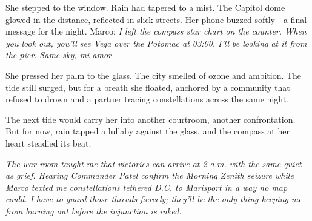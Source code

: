 She stepped to the window. Rain had tapered to a mist. The Capitol dome glowed in the distance, reflected in slick streets. Her phone buzzed softly—a final message for the night. Marco: \textit{I left the compass star chart on the counter. When you look out, you'll see Vega over the Potomac at 03:00. I'll be looking at it from the pier. Same sky, mi amor.}

She pressed her palm to the glass. The city smelled of ozone and ambition. The tide still surged, but for a breath she floated, anchored by a community that refused to drown and a partner tracing constellations across the same night.

The next tide would carry her into another courtroom, another confrontation. But for now, rain tapped a lullaby against the glass, and the compass at her heart steadied its beat.

\noindent\textit{The war room taught me that victories can arrive at 2 a.m. with the same quiet as grief. Hearing Commander Patel confirm the \textit{Morning Zenith} seizure while Marco texted me constellations tethered D.C. to Marisport in a way no map could. I have to guard those threads fiercely; they'll be the only thing keeping me from burning out before the injunction is inked.}
